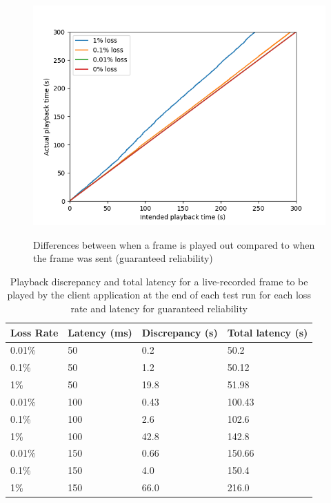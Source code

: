 \documentclass{mpaper}
\begin{document}
\begin{figure}
{   \includegraphics[scale=0.5]{images/graphics-reliable/150ms-relative-offsets-combined-reliable.png}
   \label{playback-offsets-rel-150}
 }
 \caption{Differences between when a frame is played out compared to when the frame was sent (guaranteed reliability)}
 \label{playback-offsets-rel}
\end{figure}

\begin{table}[h!]
\centering
\label{stalls-data-rel}
\begin{center}
\begin{tabular}{|p{1.5cm}|p{1.5cm}|p{2cm}|p{2cm}|}
\hline
Loss Rate & Latency (ms) & Discrepancy (s) & Total latency (s)\\ \hline
0.01\%  & 50 & 0.2 & 50.2 \\ \hline
0.1\%  & 50 & 1.2 & 50.12 \\ \hline
1\%  & 50 & 19.8 & 51.98 \\ \hline
0.01\%  & 100 & 0.43 & 100.43 \\ \hline
0.1\%  & 100 & 2.6 & 102.6 \\ \hline
1\%  & 100 & 42.8 & 142.8 \\ \hline
0.01\%  & 150 & 0.66 & 150.66 \\ \hline
0.1\%  & 150 & 4.0 & 150.4 \\ \hline
1\%  & 150 & 66.0 & 216.0 \\ \hline

\end{tabular}
\caption{Playback discrepancy and total latency for a live-recorded frame to be played by the client application at the end of each test run for each loss rate and latency for guaranteed reliability}
\label{relative-offset-table}
\end{center}
\end{table}
\end{document}
